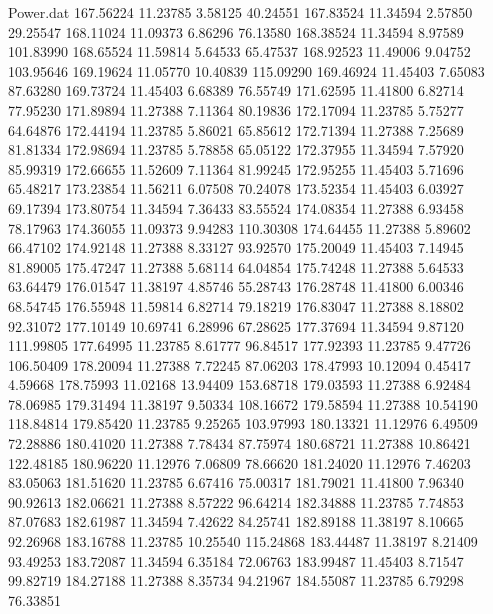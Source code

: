 \begin{filecontents}{Power.dat}
 167.56224   11.23785    3.58125   40.24551
 167.83524   11.34594    2.57850   29.25547
 168.11024   11.09373    6.86296   76.13580
 168.38524   11.34594    8.97589  101.83990
 168.65524   11.59814    5.64533   65.47537
 168.92523   11.49006    9.04752  103.95646
 169.19624   11.05770   10.40839  115.09290
 169.46924   11.45403    7.65083   87.63280
 169.73724   11.45403    6.68389   76.55749
 171.62595   11.41800    6.82714   77.95230
 171.89894   11.27388    7.11364   80.19836
 172.17094   11.23785    5.75277   64.64876
 172.44194   11.23785    5.86021   65.85612
 172.71394   11.27388    7.25689   81.81334
 172.98694   11.23785    5.78858   65.05122
 172.37955   11.34594    7.57920   85.99319
 172.66655   11.52609    7.11364   81.99245
 172.95255   11.45403    5.71696   65.48217
 173.23854   11.56211    6.07508   70.24078
 173.52354   11.45403    6.03927   69.17394
 173.80754   11.34594    7.36433   83.55524
 174.08354   11.27388    6.93458   78.17963
 174.36055   11.09373    9.94283  110.30308
 174.64455   11.27388    5.89602   66.47102
 174.92148   11.27388    8.33127   93.92570
 175.20049   11.45403    7.14945   81.89005
 175.47247   11.27388    5.68114   64.04854
 175.74248   11.27388    5.64533   63.64479
 176.01547   11.38197    4.85746   55.28743
 176.28748   11.41800    6.00346   68.54745
 176.55948   11.59814    6.82714   79.18219
 176.83047   11.27388    8.18802   92.31072
 177.10149   10.69741    6.28996   67.28625
 177.37694   11.34594    9.87120  111.99805
 177.64995   11.23785    8.61777   96.84517
 177.92393   11.23785    9.47726  106.50409
 178.20094   11.27388    7.72245   87.06203
 178.47993   10.12094    0.45417    4.59668
 178.75993   11.02168   13.94409  153.68718
 179.03593   11.27388    6.92484   78.06985
 179.31494   11.38197    9.50334  108.16672
 179.58594   11.27388   10.54190  118.84814
 179.85420   11.23785    9.25265  103.97993
 180.13321   11.12976    6.49509   72.28886
 180.41020   11.27388    7.78434   87.75974
 180.68721   11.27388   10.86421  122.48185
 180.96220   11.12976    7.06809   78.66620
 181.24020   11.12976    7.46203   83.05063
 181.51620   11.23785    6.67416   75.00317
 181.79021   11.41800    7.96340   90.92613
 182.06621   11.27388    8.57222   96.64214
 182.34888   11.23785    7.74853   87.07683
 182.61987   11.34594    7.42622   84.25741
 182.89188   11.38197    8.10665   92.26968
 183.16788   11.23785   10.25540  115.24868
 183.44487   11.38197    8.21409   93.49253
 183.72087   11.34594    6.35184   72.06763
 183.99487   11.45403    8.71547   99.82719
 184.27188   11.27388    8.35734   94.21967
 184.55087   11.23785    6.79298   76.33851

\end{filecontents}
